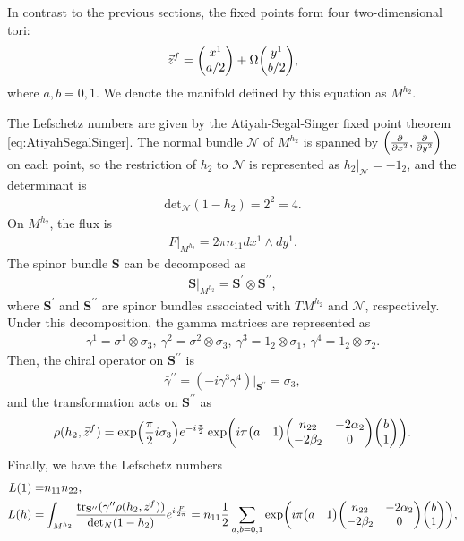 \documentclass[11pt]{article}
\newcommand{\Lef}{Lefschetz }
\begin{document}
In contrast to the previous sections, the fixed points form four two-dimensional tori:
\begin{align}
    \vec{z}^f=\mqty( x^1 \\ a/2)+ \Omega \mqty(y^1 \\ b/2),
\end{align}
where $a,b=0,1$. We denote the manifold defined by this equation as $M^{h_2}$.

The \Lef numbers are given by the Atiyah-Segal-Singer fixed point theorem \eqref{eq:AtiyahSegalSinger}. The normal bundle $\mathcal{N}$ of $M^{h_2}$ is spanned by $\qty(\pdv{}{x^2},\pdv{}{y^2})$ on each point, so the restriction of $h_2$ to $\mathcal{N}$ is represented as $h_2 |_\mathcal{N}= -1_2$, and the determinant is
\begin{align}
    \text{det}_\mathcal{N}(1-h_2 )=2^2=4.
\end{align} 
On $M^{h_2}$, the flux is 
\begin{align}
    F|_{M^{h_2}}= 2\pi n_{11} dx^1 \wedge dy^1. 
\end{align}
The spinor bundle $\mathbf{S}$ can be decomposed as 
\begin{align}
    \mathbf{S}|_{M^{h_2}}=\mathbf{S}^\prime \otimes \mathbf{S}^{\prime \prime} ,
\end{align}
where $\mathbf{S}^\prime$ and $\mathbf{S}^{\prime \prime}$ are spinor bundles associated with $TM^{h_2}$ and $\mathcal{N}$, respectively. Under this decomposition, the gamma matrices are represented as
\begin{align}
    \gamma^1= \sigma^1 \otimes \sigma_3,~ \gamma^2= \sigma^2 \otimes \sigma_3,~ \gamma^3= 1_2 \otimes \sigma_1,~\gamma^4= 1_2 \otimes \sigma_2.
\end{align}
Then, the chiral operator on $\mathbf{S}^{\prime \prime}$ is 
\begin{align}
    \bar{\gamma}^{\prime \prime}= (-i \gamma^3 \gamma^4)|_{\mathbf{S}^{\prime \prime}}= \sigma_3 ,
\end{align}
and the transformation acts on $\mathbf{S}^{\prime \prime}$ as
\begin{align}
    \rho(h_2, \vec{z}^f )= \exp( \frac{\pi}{2}i \sigma_3)e^{-i\frac{\pi}{2}}\exp( i \pi \mqty(a & 1) \mqty( n_{22} & -2 \alpha_2 \\ -2 \beta_2 & 0 ) \mqty(b \\ 1)). 
\end{align}
Finally, we have the \Lef numbers
\begin{align}
    L(1)= &n_{11} n_{22},\\
    L(h)=&  \int_{M^{h_2}} \frac{\text{tr}_{ \mathbf{S}^{\prime \prime} }( \bar{\gamma}^{\prime \prime} \rho(h_2, \vec{z}^f ) ) }{\text{det}_N (1-h_2 )}e^{i \frac{F}{2 \pi}}= n_{11} \frac{1}{2} \sum_{a,b=0,1} \exp( i \pi \mqty(a & 1) \mqty( n_{22} & -2 \alpha_2 \\ -2 \beta_2 & 0 ) \mqty(b \\ 1)),
\end{align}
\end{document}

